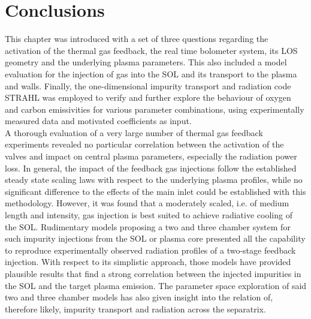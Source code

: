     \section{Conclusions}\label{sec:conclusionschap3}%
%
        This chapter was introduced with a set of three questions regarding the activation of the thermal gas feedback, the real time bolometer system, its LOS geometry and the underlying plasma parameters. This also included a model evaluation for the injection of gas into the SOL and its transport to the plasma and walls. Finally, the one-dimensional impurity transport and radiation code STRAHL was employed to verify and further explore the behaviour of oxygen and carbon emissivities for various parameter combinations, using experimentally measured data and motivated coefficients as input.\\%
        A thorough evaluation of a very large number of thermal gas feedback experiments revealed no particular correlation between the activation of the valves and impact on central plasma parameters, especially the radiation power loss. In general, the impact of the feedback gas injections follow the established steady state scaling laws with respect to the underlying plasma profiles, while no significant difference to the effects of the main inlet could be established with this methodology. However, it was found that a moderately scaled, i.e. of medium length and intensity, gas injection is best suited to achieve radiative cooling of the SOL. Rudimentary models proposing a two and three chamber system for such impurity injections from the SOL or plasma core presented all the capability to reproduce experimentally observed radiation profiles of a two-stage feedback injection. With respect to its simplistic approach, those models have provided plausible results that find a strong correlation between the injected impurities in the SOL and the target plasma emission. The parameter space exploration of said two and three chamber models has also given insight into the relation of, therefore likely, impurity transport and radiation across the separatrix.\\%
